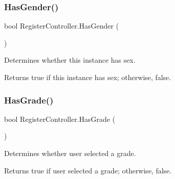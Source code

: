\mbox{\label{classRegisterController_a6c0e18d451f9960d33d798e12c1fd6d0}} 
\subsubsection{\texorpdfstring{Has\+Gender()}{HasGender()}}
{\footnotesize\ttfamily bool Register\+Controller.\+Has\+Gender (\begin{DoxyParamCaption}{ }\end{DoxyParamCaption})\hspace{0.3cm}{\ttfamily [inline]}}



Determines whether this instance has sex. 

\begin{DoxyReturn}{Returns}
{\ttfamily true} if this instance has sex; otherwise, {\ttfamily false}.
\end{DoxyReturn}
\mbox{\label{classRegisterController_ace91b2c3a079dbe729ece56c3e4a1552}} 
\subsubsection{\texorpdfstring{Has\+Grade()}{HasGrade()}}
{\footnotesize\ttfamily bool Register\+Controller.\+Has\+Grade (\begin{DoxyParamCaption}{ }\end{DoxyParamCaption})\hspace{0.3cm}{\ttfamily [inline]}}



Determines whether user selected a grade. 

\begin{DoxyReturn}{Returns}
{\ttfamily true} if user selected a grade; otherwise, {\ttfamily false}.
\end{DoxyReturn}
\mbox{\label{classRegisterController_ab107f3182247b1b6f62ba81278dba550}} 
